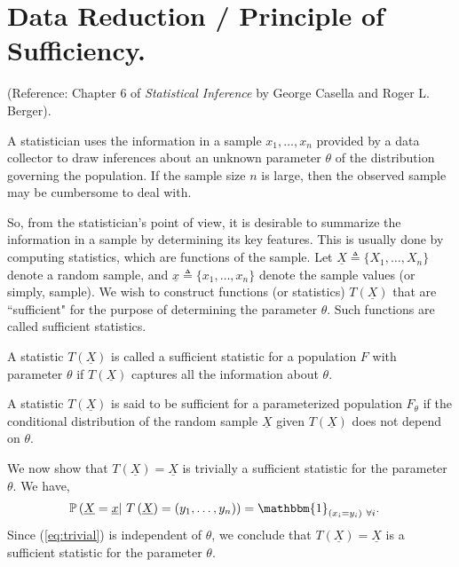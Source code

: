 \documentclass[a4paper,english,12pt]{article}
\begin{document}
\section{Data Reduction / Principle of Sufficiency.}
(Reference: Chapter $ 6 $ of {\textit{Statistical Inference} by George Casella and Roger L. Berger}).
\par A statistician uses the information in a sample $  x_1, \dots, x_n  $ provided by a data collector to draw inferences about an unknown parameter $ \theta $ of the distribution governing the population. If the sample size $ n $ is large, then the observed sample may be cumbersome to deal with. 
\par So, from the statistician's point of view, it is desirable to summarize the information in a sample by determining its key features. This is usually done by computing statistics, which are functions of the sample. Let $ \underline{X} \triangleq \{X_1, \dots, X_n\} $ denote a random sample, and $ \underline{x} \triangleq \{x_1, \dots, x_n\} $ denote the sample values (or simply, sample).  We wish to construct functions (or statistics) $ T\left(\underline{X}\right) $ that are ``sufficient" for the purpose of determining the parameter $ \theta $. Such functions are called sufficient statistics.
\begin{defn}
	A statistic $ T\left(\underline{X}\right) $ is called a sufficient statistic for a population $ F $ with parameter $ \theta $ if $ T\left(\underline{X}\right) $ captures all the information about $ \theta $.
\end{defn}
\begin{defn}
	A statistic $ T\left(\underline{X}\right) $ is said to be sufficient for a parameterized population $ F_{\theta} $ if the conditional distribution of the random sample $ \underline{X} $ given $ T\left(\underline{X}\right) $ does not depend on $ \theta $. 
\end{defn}
\begin{exmp}
	We now show that $ T(\underline{X})=\underline{X} $ is trivially a sufficient statistic for the parameter $ \theta $. We have,
	\begin{align}
	 \mathbb{P}\left(\underline{X} = \underline{x} \vert ~ T\left(\underline{X}\right) = \left(y_1, \ldots, y_n\right) \right) &= \mathbbm{1}_{\left( x_i = y_i \right)~ \forall i}.\label{eq:trivial}
	\end{align}
	Since (\ref*{eq:trivial}) is independent of $ \theta $, we conclude that $ T\left(\underline{X}\right) = \underline{X}$ is a sufficient statistic for the parameter $ \theta $.
\end{exmp}
\end{document}
